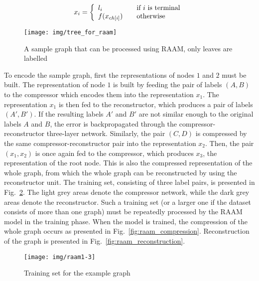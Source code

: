 \begin{equation}
x_i = \left\{
\begin{array}{l l}
	l_i & \quad \text{if $i$ is terminal} \\
	f(x_{ch[i]}) & \quad \text{otherwise}
\end{array}
\right.
\label{eq:raam_representation}
\end{equation}

\begin{figure}
\begin{center}
	\texttt{[image: img/tree\_for\_raam]}
	\caption{A sample graph that can be processed using RAAM, only leaves are labelled}
	\label{fig:tree_for_raam}
\end{center}
\end{figure}

To encode the sample graph, first the representations of nodes $1$ and $2$ must be built. The representation of node $1$ is built by feeding the pair of labels $(A, B)$ to the compressor which encodes them into the representation $x_1$. The representation $x_1$ is then fed to the reconstructor, which produces a pair of labels $(A', B')$. If the resulting labels $A'$ and $B'$ are not similar enough to the original labels $A$ and $B$, the error is backpropagated through the compressor-reconstructor three-layer network. Similarly, the pair $(C, D)$ is compressed by the same compressor-reconstructor pair into the representation $x_2$. Then, the pair $(x_1, x_2)$ is once again fed to the compressor, which produces $x_3$, the representation of the root node. This is also the compressed representation of the whole graph, from which the whole graph can be reconstructed by using the reconstructor unit. The training set, consisting of three label pairs, is presented in Fig.~\ref{fig:raam1-3}. The light grey areas denote the compressor network, while the dark grey areas denote the reconstructor. Such a training set (or a larger one if the dataset consists of more than one graph) must be repeatedly processed by the RAAM model in the training phase. When the model is trained, the compression of the whole graph occurs as presented in Fig.~\ref{fig:raam_compression}. Reconstruction of the graph is presented in Fig.~\ref{fig:raam_reconstruction}.

\begin{figure}
\begin{center}
	\texttt{[image: img/raam1-3]}
	\caption{Training set for the example graph}
	\label{fig:raam1-3}
\end{center}
\end{figure}

